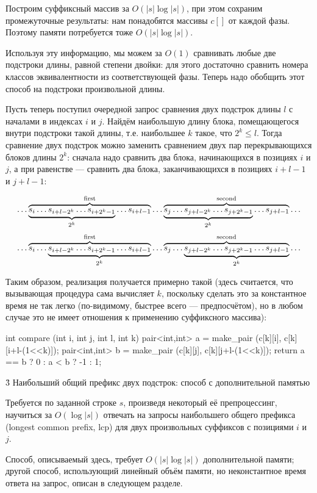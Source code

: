 Построим суффиксный массив за $O (|s| \log |s|)$, при этом сохраним промежуточные результаты: нам понадобятся массивы $c[]$ от каждой фазы. Поэтому памяти потребуется тоже $O (|s| \log |s|)$.

Используя эту информацию, мы можем за $O(1)$ сравнивать любые две подстроки длины, равной степени двойки: для этого достаточно сравнить номера классов эквивалентности из соответствующей фазы. Теперь надо обобщить этот способ на подстроки произвольной длины.

Пусть теперь поступил очередной запрос сравнения двух подстрок длины $l$ с началами в индексах $i$ и $j$. Найдём наибольшую длину блока, помещающегося внутри подстроки такой длины, т.е. наибольшее $k$ такое, что $2^k \le l$. Тогда сравнение двух подстрок можно заменить сравнением двух пар перекрывающихся блоков длины $2^k$: сначала надо сравнить два блока, начинающихся в позициях $i$ и $j$, а при равенстве --- сравнить два блока, заканчивающихся в позициях $i+l-1$ и $j+l-1$:

$$ \ldots \overbrace{ \underbrace{ s_i \ldots s_{i+l-2^k} \ldots s_{i+2^k-1} }_{2^k} \ldots s_{i+l-1} }^{\rm first} \ldots \overbrace{ \underbrace{ s_j \ldots s_{j+l-2^k} \ldots s_{j+2^k-1} }_{2^k} \ldots s_{j+l-1} }^{\rm second} \ldots $$
$$ \ldots \overbrace{ s_i \ldots \underbrace{ s_{i+l-2^k} \ldots s_{i+2^k-1} \ldots s_{i+l-1} }_{2^k} }^{\rm first} \ldots \overbrace{ s_j \ldots \underbrace{ s_{j+l-2^k} \ldots s_{j+2^k-1} \ldots s_{j+l-1} }_{2^k} }^{\rm second} \ldots $$

Таким образом, реализация получается примерно такой (здесь считается, что вызывающая процедура сама вычисляет $k$, поскольку сделать это за константное время не так легко (по-видимому, быстрее всего --- предпосчётом), но в любом случае это не имеет отношения к применению суффиксного массива):

\code
int compare (int i, int j, int l, int k) {
	pair<int,int> a = make_pair (c[k][i], c[k][i+l-(1<<k)]);
	pair<int,int> b = make_pair (c[k][j], c[k][j+l-(1<<k)]);
	return a == b ? 0 : a < b ? -1 : 1;
}
\endcode


\h3{ Наибольший общий префикс двух подстрок: способ с дополнительной памятью }

Требуется по заданной строке $s$, произведя некоторый её препроцессинг, научиться за $O(\log |s|)$ отвечать на запросы наибольшего общего префикса (longest common prefix, lcp) для двух произвольных суффиксов с позициями $i$ и $j$.

Способ, описываемый здесь, требует $O (|s| \log |s|)$ дополнительной памяти; другой способ, использующий линейный объём памяти, но неконстантное время ответа на запрос, описан в следующем разделе.

